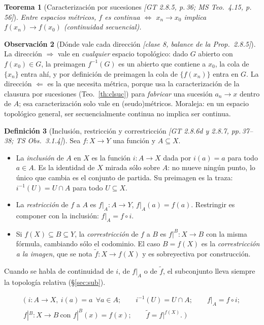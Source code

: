\documentclass[11pt,a4paper]{article}
\newenvironment{lista}{\leavevmode\begin{itemize}[leftmargin=1.5em,itemsep=1pt,topsep=2pt,parsep=0pt]}{\end{itemize}}
\newcommand{\lgc}[1]{\par\vspace{-3pt}\begin{gather*}\big(\;#1\;\big)\end{gather*}\vspace{-6pt}}
\theoremstyle{definition}
\newtheorem{definicion}{Definición}[section]
\newtheorem{observacion}[definicion]{Observación}
\theoremstyle{plain}
\newtheorem{teorema}[definicion]{Teorema}
\newcommand{\fnt}[1]{{\normalfont\small\itshape\color{gray!150!black}[#1]}}
\begin{document}
\begin{teorema}[Caracterización por sucesiones \fnt{GT 2.8.5, p.\,36; MS Teo.\ 4.15, p.\,56}]\label{th:seq}
Entre espacios métricos, $f$ es continua $\iff$ $x_n\to x_0$ implica $f(x_n)\to f(x_0)$ (continuidad secuencial).
\end{teorema}

\begin{observacion}[Dónde vale cada dirección \fnt{clase 8, balance de la Prop.\ 2.8.5}]
La dirección $\Rightarrow$ vale en \emph{cualquier} espacio topológico: dado $G$ abierto con $f(x_0)\in G$, la preimagen $f^{-1}(G)$ es un abierto que contiene a $x_0$, la cola de $\{x_n\}$ entra ahí, y por definición de preimagen la cola de $\{f(x_n)\}$ entra en $G$. La dirección $\Leftarrow$ es la que necesita métrica, porque usa la caracterización de la clausura por sucesiones (Teo.~\ref{th:clsuc}) para \emph{fabricar} una sucesión $a_n\to x$ dentro de $A$; esa caracterización solo vale en (seudo)métricos. Moraleja: en un espacio topológico general, ser secuencialmente continua no implica ser continua.
\end{observacion}

\begin{definicion}[Inclusión, restricción y correstricción \fnt{GT 2.8.6d y 2.8.7, pp.\,37--38; TS Obs.\ 3.1.4}]
Sea $f:X\to Y$ una función y $A\subseteq X$.
\begin{lista}
\item La \emph{inclusión} de $A$ en $X$ es la función $i:A\to X$ dada por $i(a)=a$ para todo $a\in A$. Es la identidad de $X$ mirada sólo sobre $A$: no mueve ningún punto, lo único que cambia es el conjunto de partida. Su preimagen es la traza: $i^{-1}(U)=U\cap A$ para todo $U\subseteq X$.
\item La \emph{restricción} de $f$ a $A$ es $f|_A:A\to Y$, $f|_A(a)=f(a)$. Restringir es componer con la inclusión: $f|_A=f\circ i$.
\item Si $f(X)\subseteq B\subseteq Y$, la \emph{correstricción} de $f$ a $B$ es $f|^{B}:X\to B$ con la misma fórmula, cambiando sólo el codominio. El caso $B=f(X)$ es la \emph{correstricción a la imagen}, que se nota $\widetilde f:X\to f(X)$ y es sobreyectiva por construcción.
\end{lista}
Cuando se habla de continuidad de $i$, de $f|_A$ o de $\widetilde f$, el subconjunto lleva siempre la topología relativa (\S\ref{sec:sub}).
\lgc{i:A\to X,\ i(a)=a\ \ \forall a\in A;\qquad i^{-1}(U)=U\cap A;\qquad f|_A=f\circ i;\\
f|^{B}:X\to B\ \text{con } f|^{B}(x)=f(x);\qquad \widetilde f=f|^{f(X)}.}
\end{definicion}
\end{document}
